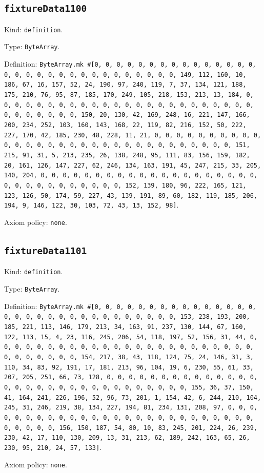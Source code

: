 \documentclass[11pt]{article}
\begin{document}
\subsection*{\texttt{fixtureData1100}}
\noindent Kind: \texttt{definition}.\par
\noindent Type: \texttt{ByteArray}.\par
\noindent Definition: \texttt{ByteArray.mk \#[0, 0, 0, 0, 0, 0, 0, 0, 0, 0, 0, 0, 0, 0, 0, 0, 0, 0, 0, 0, 0, 0, 0, 0, 0, 0, 0, 0, 0, 0, 0, 149, 112, 160, 10, 186, 67, 16, 157, 52, 24, 190, 97, 240, 119, 7, 37, 134, 121, 188, 175, 210, 76, 95, 87, 185, 170, 249, 105, 218, 153, 213, 13, 184, 0, 0, 0, 0, 0, 0, 0, 0, 0, 0, 0, 0, 0, 0, 0, 0, 0, 0, 0, 0, 0, 0, 0, 0, 0, 0, 0, 0, 0, 0, 0, 150, 20, 130, 42, 169, 248, 16, 221, 147, 166, 200, 234, 252, 103, 160, 143, 168, 22, 119, 82, 216, 152, 50, 222, 227, 170, 42, 185, 230, 48, 228, 11, 21, 0, 0, 0, 0, 0, 0, 0, 0, 0, 0, 0, 0, 0, 0, 0, 0, 0, 0, 0, 0, 0, 0, 0, 0, 0, 0, 0, 0, 0, 0, 0, 151, 215, 91, 31, 5, 213, 235, 26, 138, 248, 95, 111, 83, 156, 159, 182, 20, 161, 126, 147, 227, 62, 246, 134, 163, 191, 45, 247, 215, 33, 205, 140, 204, 0, 0, 0, 0, 0, 0, 0, 0, 0, 0, 0, 0, 0, 0, 0, 0, 0, 0, 0, 0, 0, 0, 0, 0, 0, 0, 0, 0, 0, 0, 0, 152, 139, 180, 96, 222, 165, 121, 123, 126, 50, 174, 59, 227, 43, 139, 191, 89, 60, 182, 119, 185, 206, 194, 9, 146, 122, 30, 103, 72, 43, 13, 152, 98]}.\par
\noindent Axiom policy: \texttt{none}.\par
\subsection*{\texttt{fixtureData1101}}
\noindent Kind: \texttt{definition}.\par
\noindent Type: \texttt{ByteArray}.\par
\noindent Definition: \texttt{ByteArray.mk \#[0, 0, 0, 0, 0, 0, 0, 0, 0, 0, 0, 0, 0, 0, 0, 0, 0, 0, 0, 0, 0, 0, 0, 0, 0, 0, 0, 0, 0, 0, 0, 153, 238, 193, 200, 185, 221, 113, 146, 179, 213, 34, 163, 91, 237, 130, 144, 67, 160, 122, 113, 15, 4, 23, 116, 245, 206, 54, 118, 197, 52, 156, 31, 44, 0, 0, 0, 0, 0, 0, 0, 0, 0, 0, 0, 0, 0, 0, 0, 0, 0, 0, 0, 0, 0, 0, 0, 0, 0, 0, 0, 0, 0, 0, 0, 154, 217, 38, 43, 118, 124, 75, 24, 146, 31, 3, 110, 34, 83, 92, 191, 17, 181, 213, 96, 104, 19, 6, 230, 55, 61, 33, 207, 205, 251, 66, 73, 128, 0, 0, 0, 0, 0, 0, 0, 0, 0, 0, 0, 0, 0, 0, 0, 0, 0, 0, 0, 0, 0, 0, 0, 0, 0, 0, 0, 0, 0, 0, 0, 155, 36, 37, 150, 41, 164, 241, 226, 196, 52, 96, 73, 201, 1, 154, 42, 6, 244, 210, 104, 245, 31, 246, 219, 38, 134, 227, 194, 81, 234, 131, 208, 97, 0, 0, 0, 0, 0, 0, 0, 0, 0, 0, 0, 0, 0, 0, 0, 0, 0, 0, 0, 0, 0, 0, 0, 0, 0, 0, 0, 0, 0, 0, 0, 156, 150, 187, 54, 80, 10, 83, 245, 201, 224, 26, 239, 230, 42, 17, 110, 130, 209, 13, 31, 213, 62, 189, 242, 163, 65, 26, 230, 95, 210, 24, 57, 133]}.\par
\noindent Axiom policy: \texttt{none}.\par
\end{document}
